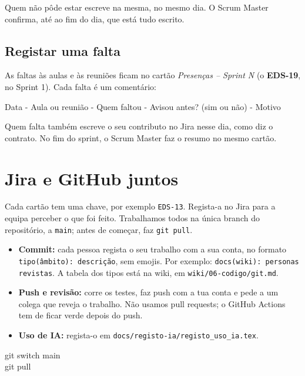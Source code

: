 \documentclass[11pt,a4paper]{article}
\begin{document}
Quem não pôde estar escreve na mesma, no mesmo dia. O Scrum Master confirma, até ao fim do dia, que está tudo escrito.

\subsection{Registar uma falta}

As faltas às aulas e às reuniões ficam no cartão \textit{Presenças – Sprint N} (o \textbf{EDS-19}, no Sprint 1). Cada falta é um comentário:

\begin{codigo}
Data - Aula ou reunião - Quem faltou - Avisou antes? (sim ou não) - Motivo
\end{codigo}

Quem falta também escreve o seu contributo no Jira nesse dia, como diz o contrato. No fim do sprint, o Scrum Master faz o resumo no mesmo cartão.

\section{Jira e GitHub juntos}

Cada cartão tem uma chave, por exemplo \texttt{EDS-13}. Regista-a no Jira para a equipa perceber o que foi feito. Trabalhamos todos na única branch do repositório, a \texttt{main}; antes de começar, faz \texttt{git pull}.

\begin{itemize}
  \item \textbf{Commit:} cada pessoa regista o seu trabalho com a sua conta, no formato \texttt{tipo(âmbito): descrição}, sem emojis. Por exemplo: \texttt{docs(wiki): personas revistas}. A tabela dos tipos está na wiki, em \texttt{wiki/06-codigo/git.md}.
  \item \textbf{Push e revisão:} corre os testes, faz push com a tua conta e pede a um colega que reveja o trabalho. Não usamos pull requests; o GitHub Actions tem de ficar verde depois do push.
  \item \textbf{Uso de IA:} regista-o em \texttt{docs/registo-ia/registo\_uso\_ia.tex}.
\end{itemize}

\begin{codigo}
git switch main\\
git pull\\
\end{codigo}
\end{document}

